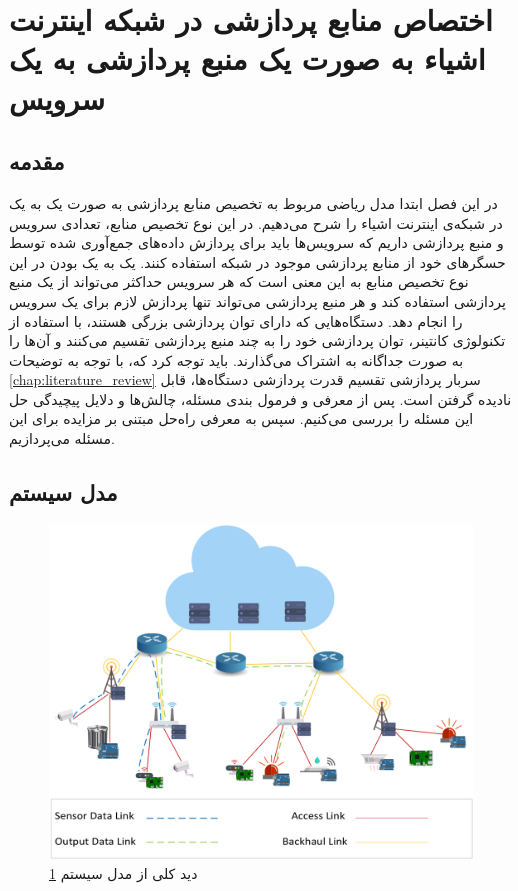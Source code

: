 \chapter{اختصاص منابع پردازشی در شبکه اینترنت اشیاء به صورت یک منبع پردازشی به یک سرویس}\label{chap:one_to_one_allocation}
  \thispagestyle{empty}
  \section{مقدمه}
    در این فصل ابتدا مدل ریاضی مربوط به تخصیص منابع پردازشی به صورت یک به یک در شبکه‌ی اینترنت اشیاء را شرح می‌دهیم. 
    در این نوع تخصیص منابع، تعدادی سرویس و منبع پردازشی داریم که سرویس‌ها باید برای پردازش داده‌های جمع‌آوری شده توسط حسگر‌های خود از منابع پردازشی موجود در شبکه استفاده کنند.
    یک به یک بودن در این نوع تخصیص منابع به این معنی است که هر سرویس حداکثر می‌تواند از یک منبع پردازشی استفاده کند و هر منبع پردازشی می‌تواند تنها پردازش لازم برای یک سرویس را انجام دهد.
    دستگاه‌هایی که دارای توان پردازشی بزرگی هستند، با استفاده از تکنولوژی کانتینر‌، توان پردازشی خود را به چند منبع پردازشی تقسیم می‌کنند و آن‌ها را به صورت جداگانه به اشتراک می‌گذارند.
    باید توجه کرد که، با توجه به توضیحات \cref{chap:literature_review} سربار پردازشی تقسیم قدرت پردازشی دستگاه‌ها، قابل نادیده گرفتن است.
    پس از معرفی و فرمول بندی مسئله، چالش‌ها و دلایل پیچیدگی حل این مسئله را بررسی می‌کنیم.
    سپس به معرفی راه‌حل مبتنی بر مزایده برای این مسئله می‌پردازیم.
  \section{مدل سیستم}
    \begin{figure}[h]
      \centerline{\includegraphics[width=12cm]{graphics/one_to_one/system_model}}
      \caption{دید کلی از مدل سیستم \cref{chap:one_to_one_allocation}}
      \label{fig:ono_to_one_system_model}
    \end{figure}

